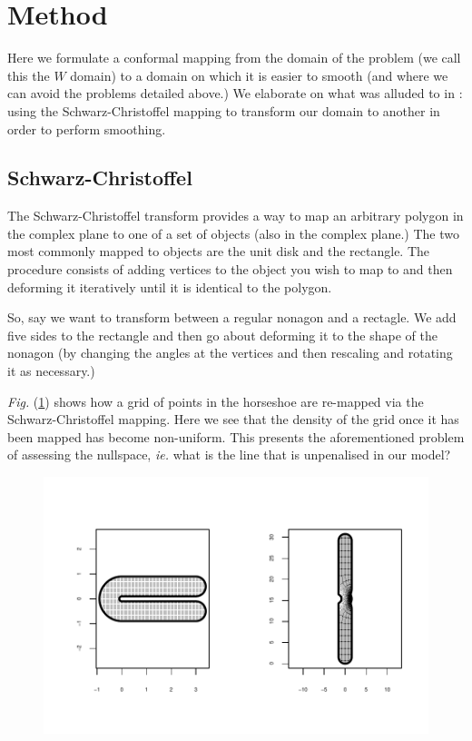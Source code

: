 \documentclass[a4paper,10pt]{amsart}
\newcommand{\sch}{Schwarz-Christoffel }
\newcommand{\Fig}[1]{\emph{Fig.} (\ref{#1})}
\begin{document}
\section{Method}

Here we formulate a conformal mapping from the domain of the problem (we call this the $W$ domain) to a domain on which it is easier to smooth (and where we can avoid the problems detailed above.) We elaborate on what was alluded to in \cite{eilerstalk}: using the \sch mapping to transform our domain to another in order to perform smoothing.

\subsection{\sch}

The \sch transform provides a way to map an arbitrary polygon in the complex plane to one of a set of objects (also in the complex plane.) The two most commonly mapped to objects are the unit disk and the rectangle. The procedure consists of adding vertices to the object you wish to map to and then deforming it iteratively until it is identical to the polygon.

So, say we want to transform between a regular nonagon and a rectagle. We add five sides to the rectangle and then go about deforming it to the shape of the nonagon (by changing the angles at the vertices and then rescaling and rotating it as necessary.) 

\Fig{hsgridmapping} shows how a grid of points in the horseshoe are re-mapped via the \sch mapping. Here we see that the density of the grid once it has been mapped has become non-uniform. This presents the aforementioned problem of assessing the nullspace, \emph{ie.} what is the line that is unpenalised in our model?

\begin{figure}
\centering
\includegraphics[trim=0.5in 0.5in 0in 0in]{figs/hsgridmapping.pdf} \\
\caption{}
\label{hsgridmapping}
\end{figure}
\end{document}

